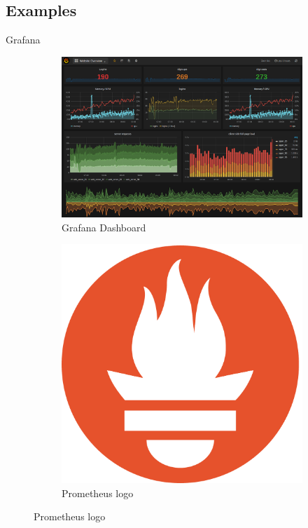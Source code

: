 \documentclass{beamer}
\begin{document}
\subsection{Examples}

\begin{frame}{Grafana}

\begin{figure}
\begin{subfigure}[h]{0.65\linewidth}
\includegraphics[width=\linewidth]{grafana.png}
\caption{Grafana Dashboard}
\end{subfigure}
\begin{subfigure}[h]{0.3\linewidth}
\includegraphics[width=\linewidth]{prometheus.png}
\caption{Prometheus logo}
\end{subfigure}
\end{figure}

\end{frame}
\end{document}
